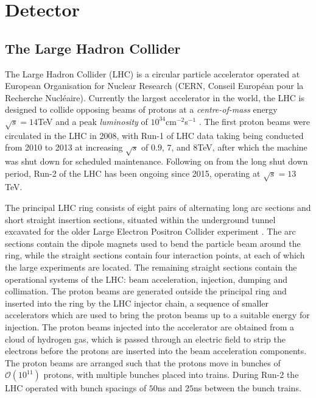 \chapter{Detector}\label{c:Det}

\section{The Large Hadron Collider}
\label{d:lhc}

	The Large Hadron Collider (LHC) is a circular particle accelerator operated at European Organisation for Nuclear Research (CERN, Conseil Europ\'{e}an pour la Recherche Nucl\'{e}aire). Currently the largest accelerator in the world, the LHC is designed to collide opposing beams of protons at a \textit{centre-of-mass} energy $\sqrt{s}=14$TeV and a peak \textit{luminosity} of $10^{34}$cm$^{-2}$s$^{-1}$ \cite{lhc}. The first proton beams were circulated in the LHC in 2008, with Run-1 of LHC data taking being conducted from 2010 to 2013 at increasing $\sqrt{s}$ of $0.9$, $7$, and $8$TeV, after which the machine was shut down for scheduled maintenance. Following on from the long shut down period, Run-2 of the LHC has been ongoing since 2015, operating at $\sqrt{s}=13$TeV.

	The principal LHC ring consists of eight pairs of alternating long arc sections and short straight insertion sections, situated within the underground tunnel excavated for the older Large Electron Positron Collider experiment \cite{lep1, lep2}. The arc sections contain the dipole magnets used to bend the particle beam around the ring, while the straight sections contain four interaction points, at each of which the large experiments are located. The remaining straight sections contain the operational systems of the LHC: beam acceleration, injection,  dumping and collimation. The proton beams are generated outside the principal ring and inserted into the ring by the LHC injector chain, a sequence of smaller accelerators which are used to bring the proton beams up to a suitable energy for injection. The proton beams injected into the accelerator are obtained from a cloud of hydrogen gas, which is passed through an electric field to strip the electrons before the protons are inserted into the beam acceleration components. The proton beams are arranged such that the protons move in bunches of $\mathcal{O}(10^{11})$ protons, with multiple bunches placed into trains. During Run-2 the LHC operated with bunch spacings of $50$ns and $25$ns between the bunch trains.

